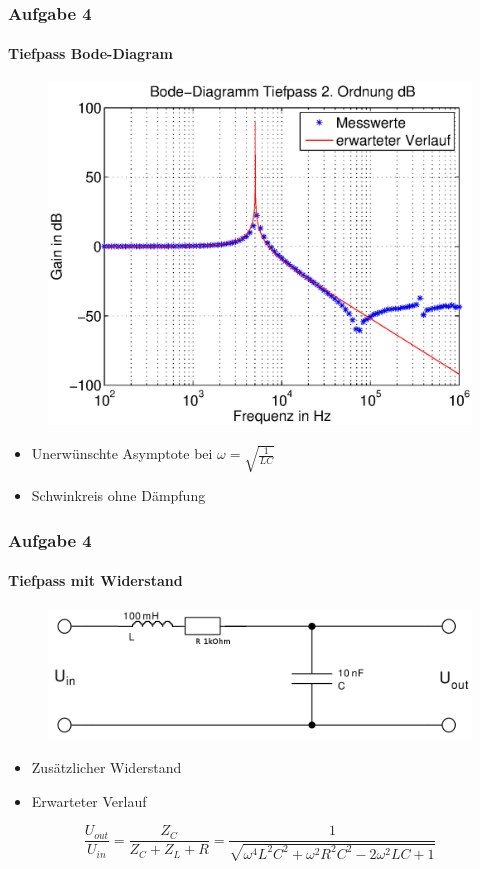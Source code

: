 \begin{frame}
\frametitle{Aufgabe 4}
\framesubtitle{Tiefpass Bode-Diagram}
    \begin{figure}[H]
    \begin{center}
            \includegraphics[scale=0.50]{./img/4a_bode_tief_dB.eps}
    \end{center}
    \end{figure}  
\begin{itemize}
    \item Unerwünschte Asymptote bei $\omega = \sqrt{\frac{1}{LC}}$
    \item Schwinkreis ohne Dämpfung
\end{itemize}
\end{frame}
\begin{frame}
    \frametitle{Aufgabe 4}
    \framesubtitle{Tiefpass mit Widerstand}
     \begin{figure}[H]
     \begin{center}
             \includegraphics[scale=0.2]{./img/4a_tiefpass_3.png}
     \end{center}
     \end{figure} 
     \begin{itemize}
        \item Zusätzlicher Widerstand
         \item Erwarteter Verlauf
     \end{itemize}
     \begin{equation*}
         \frac{U_{out}}{U_{in}}
         =
         \frac{Z_C}{Z_C + Z_L + R}
         =
         \frac{1}{\sqrt{\omega^4 L^2 C^2 + \omega^2 R^2 C^2 - 2 \omega^2 LC + 1}}
     \end{equation*}
\end{frame}
